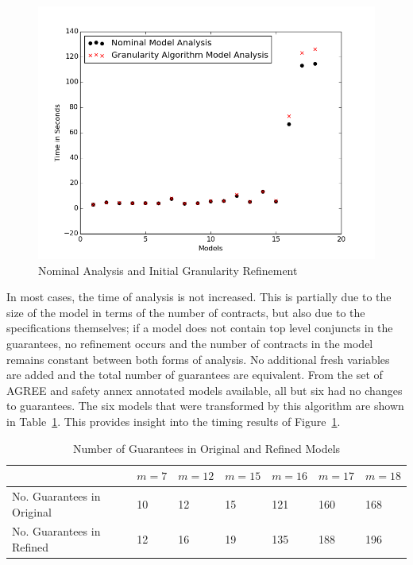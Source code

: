 \begin{figure}[h!]
\begin{center}
\includegraphics[width=.8\textwidth]{images/graphGranularityAND15Models.PNG}
\caption{Nominal Analysis and Initial Granularity Refinement} \label{fig:graphGranularityAND}
\end{center}
\end{figure}

In most cases, the time of analysis is not increased. This is partially due to the size of the model in terms of the number of contracts, but also due to the specifications themselves; if a model does not contain top level conjuncts in the guarantees, no refinement occurs and the number of contracts in the model remains constant between both forms of analysis. No additional fresh variables are added and the total number of guarantees are equivalent. From the set of AGREE and safety annex annotated models available, all but six had no changes to guarantees. The six models that were transformed by this algorithm are shown in Table~\ref{tab:guarNoANDRefinement}. This provides insight into the timing results of Figure~\ref{fig:graphGranularityAND}.

\begin{table}[htbp]
\begin{center}
    \begin{tabular}{ | l | l | l | l | l | l | l | }
    \hline
    \textbf{} & $m=7$ & $m=12$ & $m=15$ & $m=16$ & $m = 17$ 
		& $m=18$    \\ \hline \hline
    No. Guarantees in Original & 10 & 12 & 15 & 121 & 160 & 168   \\ \hline
    No. Guarantees in Refined & 12 & 16 & 19 & 135 & 188 & 196   \\ \hline
    \end{tabular}
    \caption{Number of Guarantees in Original and Refined Models}
    \label{tab:guarNoANDRefinement}
    \end{center}
\end{table}

